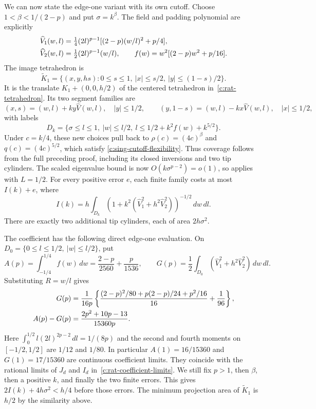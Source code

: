 We can now state the edge-one variant with its own cutoff.  Choose
$1<\beta<1/(2-p)$ and put $\sigma=k^\beta$.  The field and padding
polynomial are explicitly
\begin{align}
 \widehat V_1(w,l)&=\tfrac14(2l)^{p-1}
       [(2-p)(w/l)^2+p/4],\notag\\
 \widehat V_2(w,l)&=\tfrac12(2l)^{p-1}(w/l),\qquad
 f(w)=w^2[(2-p)w^2+p/16].
 \label{c:sing-edge-one-field}
\end{align}
The image tetrahedron is
\[
 \widetilde K_1=\{(x,y,hs):0\le s\le1,\ |x|\le s/2,
                         \ |y|\le(1-s)/2\}.
\]
It is the translate $K_1+(0,0,h/2)$ of the centered tetrahedron
in~\eqref{c:rat-tetrahedron}.  Its two segment families are
\[
 (x,s)=(w,l)+ky\widehat V(w,l),\quad |y|\le1/2,
 \qquad
 (y,1-s)=(w,l)-kx\widehat V(w,l),\quad |x|\le1/2,
\]
with labels
\[
 D_k=\{\sigma\le l\le1,\ |w|\le l/2,
             \ l\le1/2+k^2f(w)+k^{5/2}\}.
\]
Under $c=k/4$, these new choices pull back to
$\rho(c)=(4c)^\beta$ and $q(c)=(4c)^{5/2}$, which satisfy
\eqref{c:sing-cutoff-flexibility}.  Thus coverage follows from the
full preceding proof, including its closed inversions and two tip
cylinders.  The scaled eigenvalue bound is now
$O(k\sigma^{p-2})=o(1)$, so \BScaling{} applies with $L=1/2$.
For every positive error $e$, each finite family costs at most $I(k)+e$,
where
\begin{equation}
 I(k)=h\int_{D_k}
       (1+k^2(\widehat V_1^2+h^2\widehat V_2^2))^{-1/2}\,dw\,dl.
 \label{c:sing-edge-one-cost}
\end{equation}
There are exactly two additional tip cylinders, each of area
$2h\sigma^2$.

The coefficient has the following direct edge-one evaluation.  On
$D_0=\{0\le l\le1/2,\ |w|\le l/2\}$, put
\[
 A(p)=\int_{-1/4}^{1/4}f(w)\,dw
       =\frac{2-p}{2560}+\frac{p}{1536},
 \qquad
 G(p)=\frac12\int_{D_0}(\widehat V_1^2+h^2\widehat V_2^2)\,dw\,dl.
\]
Substituting $R=w/l$ gives
\begin{align}
 G(p)&=\frac1{16p}
 \left\{\frac{(2-p)^2/80+p(2-p)/24+p^2/16}{16}
                    +\frac1{96}\right\},\notag\\
 A(p)-G(p)&=\frac{2p^2+10p-13}{15360p}.
 \label{c:sing-edge-one-coefficient}
\end{align}
Here $\int_0^{1/2}l(2l)^{2p-2}\,dl=1/(8p)$ and the second
and fourth moments on $[-1/2,1/2]$ are $1/12$ and $1/80$.
In particular $A(1)=16/15360$ and $G(1)=17/15360$ are continuous
coefficient limits. They coincide with the rational limits of $J_d$
and $I_d$ in~\eqref{c:rat-coefficient-limits}.
We still fix $p>1$, then $\beta$, then a positive $k$, and finally
the two finite errors.  This gives $2I(k)+4h\sigma^2<h/4$ before
those errors.  The minimum projection area of $\widetilde K_1$ is
$h/2$ by the similarity above.

